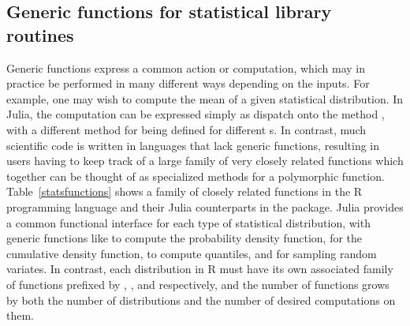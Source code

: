 \documentclass[pldi]{sigplanconf-pldi15}
\begin{document}
\subsection{Generic functions for statistical library routines}

Generic functions express a common action or computation, which may in
practice be performed in many different ways depending on the inputs. For
example, one may wish to compute the mean of a given statistical distribution.
In Julia, the computation can be expressed simply as dispatch onto the method
, with a different method for  being
defined for different s. In contrast, much scientific code
is written in languages that lack generic functions, resulting in users having
to keep track of a large family of very closely related functions which
together can be thought of as specialized methods for a polymorphic function.
Table~\ref{statsfunctions} shows a family of closely related functions in the R
programming language and their Julia counterparts in the
 package. Julia provides a common functional interface
for each type of statistical distribution, with generic functions like
 to compute the probability density function,  for the
cumulative density function,  to compute quantiles, and
 for sampling random variates. In contrast, each distribution in R
must have its own associated family of functions prefixed by ,
,  and  respectively, and the number of functions grows
by both the number of distributions and the number of desired computations on
them.

\end{document}

